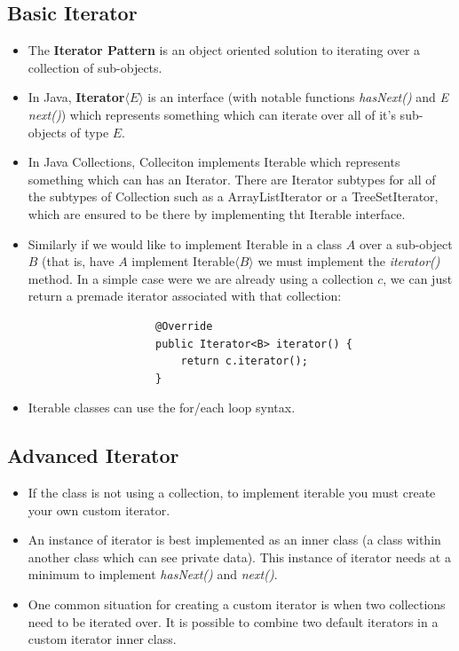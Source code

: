\documentclass[letterpaper] {article}
\begin{document}
    \subsection{Basic Iterator}
    \begin{itemize}
        \item The \textbf{Iterator Pattern} is an object oriented solution to iterating over a collection of sub-objects. 
        \item In Java, \textbf{Iterator$\langle E \rangle$} is an interface (with notable functions \textit{hasNext()} and \textit{E next()}) which represents something which can iterate over all of it's sub-objects of type $E$. 
        \item In Java Collections, Colleciton implements Iterable which represents something which can has an Iterator. There are Iterator subtypes for all of the subtypes of Collection such as a ArrayListIterator or a TreeSetIterator, which are ensured to be there by implementing tht Iterable interface. 
        \item Similarly if we would like to implement Iterable in a class $A$ over a sub-object $B$ (that is, have $A$ implement Iterable$\langle B \rangle$ we must implement the \textit{iterator()} method. In a simple case were we are already using a collection $c$, we can just return a premade iterator associated with that collection:
                \begin{lstlisting}
                    @Override
                    public Iterator<B> iterator() {
                        return c.iterator();
                    }
                \end{lstlisting}
            \item Iterable classes can use the for/each loop syntax. 
    \end{itemize}

    \subsection{Advanced Iterator}
    \begin{itemize}
        \item If the class is not using a collection, to implement iterable you must create your own custom iterator. 
        \item An instance of iterator is best implemented as an inner class (a class within another class which can see private data). This instance of iterator needs at a minimum to implement \textit{hasNext()} and \textit{next()}.
        \item One common situation for creating a custom iterator is when two collections need to be iterated over. It is possible to combine two default iterators in a custom iterator inner class.
    \end{itemize}
\end{document}
